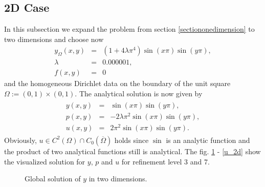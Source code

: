 \documentclass[a4paper, 11pt, twoside]{article}
\begin{document}
\subsection{2D Case}\label{sectiontwodimensions}
In this subsection we expand the problem from section \ref{sectiononedimension} to two dimensions and choose now
\begin{eqnarray}
y_{\Omega}(x, y) &=& (1 + 4\lambda \pi^4) \sin (x \pi)  \sin (y \pi), \\
\lambda &=& 0.000001, \\
f(x, y) &=& 0
\end{eqnarray}
and the homogeneous Dirichlet data on the boundary of the unit square $\Omega:=(0,1)\times(0,1)$. The analytical solution is now given by 
\begin{eqnarray}\label{analyticalsolution}
\begin{array}{rcl}
y(x, y) &=& \sin (x\pi) \sin (y\pi), \\
p(x, y) &=& -2 \lambda \pi^2 \sin (x\pi)\sin (y\pi), \\
u(x, y) &=& 2 \pi^2 \sin (x\pi) \sin (y\pi).
\end{array}
\end{eqnarray}
Obviously, $u \in C^2(\Omega) \cap C_0(\overline{\Omega})$ holds since $\sin$ is an analytic function and the product of two analytical functions still is analytical.
The fig. \ref{y_2d} - \ref{u_2d} show the visualized solution for $y$, $p$ and $u$ for refinement level 3 and 7.

\begin{figure}[h!]
	\centering
\caption{Global solution of $y$ in two dimensions.}
\label{y_2d}
\end{figure}
\end{document}
